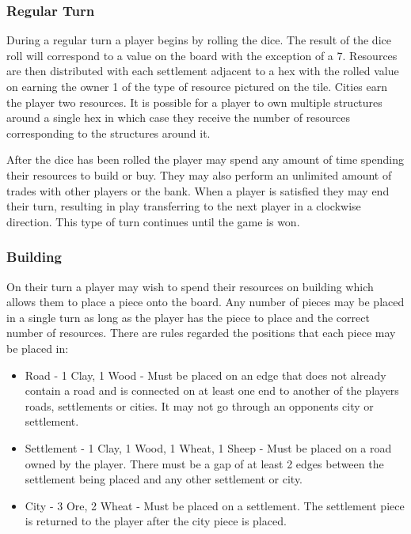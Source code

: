 \documentclass[]{article}
\begin{document}
\subsubsection{Regular Turn}
During a regular turn a player begins by rolling the dice. The result of the dice roll will correspond to a value on the board with the exception of a 7. Resources are then distributed with each settlement adjacent to a hex with the rolled value on earning the owner 1 of the type of resource pictured on the tile. Cities earn the player two resources. It is possible for a player to own multiple structures around a single hex in which case they receive the number of resources corresponding to the structures around it.

\par After the dice has been rolled the player may spend any amount of time spending their resources to build or buy. They may also perform an unlimited amount of trades with other players or the bank. When a player is satisfied they may end their turn, resulting in play transferring to the next player in a clockwise direction. This type of turn continues until the game is won.

\subsubsection{Building}
On their turn a player may wish to spend their resources on building which allows them to place a piece onto the board. Any number of pieces may be placed in a single turn as long as the player has the piece to place and the correct number of resources. There are rules regarded the positions that each piece may be placed in:

\begin{itemize}
  \item Road - 1 Clay, 1 Wood - Must be placed on an edge that does not already contain a road and is connected on at least one end to another of the players roads, settlements or cities. It may not go through an opponents city or settlement.
  \item Settlement - 1 Clay, 1 Wood, 1 Wheat, 1 Sheep - Must be placed on a road owned by the player. There must be a gap of at least 2 edges between the settlement being placed and any other settlement or city.
  \item City - 3 Ore, 2 Wheat - Must be placed on a settlement. The settlement piece is returned to the player after the city piece is placed.
\end{itemize}
\end{document}
